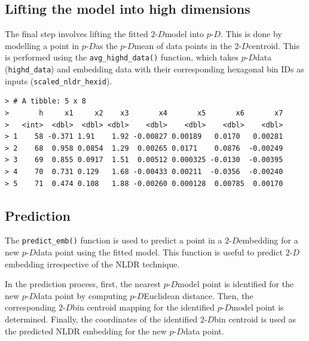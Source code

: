 \documentclass[
  11pt,
  a4paper,
]{report}
\newenvironment{Shaded}{\begin{snugshade}}{\end{snugshade}}
\newcommand{\AttributeTok}[1]{\textcolor[rgb]{0.40,0.45,0.13}{#1}}
\newcommand{\DecValTok}[1]{\textcolor[rgb]{0.68,0.00,0.00}{#1}}
\newcommand{\FunctionTok}[1]{\textcolor[rgb]{0.28,0.35,0.67}{#1}}
\newcommand{\NormalTok}[1]{\textcolor[rgb]{0.00,0.23,0.31}{#1}}
\newcommand{\OtherTok}[1]{\textcolor[rgb]{0.00,0.23,0.31}{#1}}
\newcommand{\SpecialCharTok}[1]{\textcolor[rgb]{0.37,0.37,0.37}{#1}}
\newcommand\pD{$p\text{-}D$}
\newcommand{\twoD}{$2\text{-}D$}
\begin{document}
\subsection{Lifting the model into high
dimensions}\label{lifting-the-model-into-high-dimensions}

The final step involves lifting the fitted \twoD model into \pD. This is
done by modelling a point in \pD as the \pD mean of data points in the
\twoD centroid. This is performed using the \texttt{avg\_highd\_data()}
function, which takes \pD data (\texttt{highd\_data}) and embedding data
with their corresponding hexagonal bin IDs as inputs
(\texttt{scaled\_nldr\_hexid}).

\begin{Shaded}
\end{Shaded}

\begin{verbatim}
> # A tibble: 5 x 8
>       h     x1     x2    x3       x4       x5       x6       x7
>   <int>  <dbl>  <dbl> <dbl>    <dbl>    <dbl>    <dbl>    <dbl>
> 1    58 -0.371 1.91    1.92 -0.00827 0.00189   0.0170   0.00281
> 2    68  0.958 0.0854  1.29  0.00265 0.0171    0.0876  -0.00249
> 3    69  0.855 0.0917  1.51  0.00512 0.000325 -0.0130  -0.00395
> 4    70  0.731 0.129   1.68 -0.00433 0.00211  -0.0356  -0.00240
> 5    71  0.474 0.108   1.88 -0.00260 0.000128  0.00785  0.00170
\end{verbatim}

\subsection{Prediction}\label{prediction}

The \texttt{predict\_emb()} function is used to predict a point in a
\twoD embedding for a new \pD data point using the fitted model. This
function is useful to predict \twoD embedding irrespective of the NLDR
technique.

In the prediction process, first, the nearest \pD model point is
identified for the new \pD data point by computing \pD Euclidean
distance. Then, the corresponding \twoD bin centroid mapping for the
identified \pD model point is determined. Finally, the coordinates of
the identified \twoD bin centroid is used as the predicted NLDR
embedding for the new \pD data point.
\end{document}
